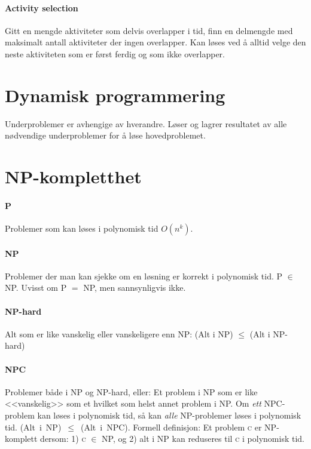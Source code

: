 \documentclass[a4paper]{article}
\begin{document}
\paragraph{Activity selection} Gitt en mengde aktiviteter som delvis overlapper i tid, finn en delmengde med maksimalt antall aktiviteter der ingen overlapper. Kan løses ved å alltid velge den neste aktiviteten som er først ferdig og som ikke overlapper.



\section{Dynamisk programmering}
Underproblemer er avhengige av hverandre. Løser og lagrer resultatet av alle nødvendige underproblemer for å løse hovedproblemet.



\section{NP-kompletthet}
\paragraph{P} Problemer som kan løses i polynomisk tid $O(n^k)$.
\paragraph{NP} Problemer der man kan sjekke om en løsning er korrekt i polynomisk tid. P $\in$ NP. Uvisst om P $=$ NP, men sannsynligvis ikke.
\paragraph{NP-hard} Alt som er like vanskelig eller vanskeligere enn NP: (Alt i NP) $\leqslant$ (Alt i NP-hard)
\paragraph{NPC} Problemer både i NP og NP-hard, eller: Et problem i NP som er like <<vanskelig>> som et hvilket som helst annet problem i NP. Om \emph{ett} NPC-problem kan løses i polynomisk tid, så kan \emph{alle} NP-problemer løses i polynomisk tid. \mbox{(Alt i NP) $\leqslant$ (Alt i NPC)}. Formell definisjon: Et problem  \textsc{c} er NP-komplett dersom: 1) \textsc{c} $\in$ NP, og 2) alt i NP kan reduseres til \textsc{c} i polynomisk tid.
\end{document}
